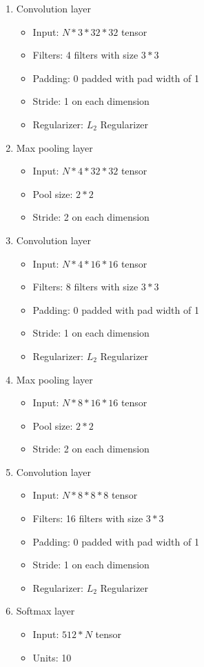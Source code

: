 \documentclass{article}
\begin{document}
\begin{enumerate}
    \item{Convolution layer}
        \begin{itemize}
            \item{Input: $N * 3 * 32 * 32$ tensor}
            \item{Filters: 4 filters with size $3*3$}
            \item{Padding: 0 padded with pad width of 1}
            \item{Stride: 1 on each dimension}
            \item{Regularizer: $L_2$ Regularizer}
        \end{itemize}
    \item{Max pooling layer}
        \begin{itemize}
            \item{Input: $N * 4 * 32 * 32$ tensor}
            \item{Pool size: $2*2$}
            \item{Stride: 2 on each dimension}
        \end{itemize}
    \item{Convolution layer}
        \begin{itemize}
            \item{Input: $N * 4 * 16 * 16$ tensor}
            \item{Filters: 8 filters with size $3*3$}
            \item{Padding: 0 padded with pad width of 1}
            \item{Stride: 1 on each dimension}
            \item{Regularizer: $L_2$ Regularizer}
        \end{itemize}
    \item{Max pooling layer}
        \begin{itemize}
            \item{Input: $N * 8 * 16 * 16$ tensor}
            \item{Pool size: $2*2$}
            \item{Stride: 2 on each dimension}
        \end{itemize}
    \item{Convolution layer}
        \begin{itemize}
            \item{Input: $N * 8 * 8 * 8$ tensor}
            \item{Filters: 16 filters with size $3*3$}
            \item{Padding: 0 padded with pad width of 1}
            \item{Stride: 1 on each dimension}
            \item{Regularizer: $L_2$ Regularizer}
        \end{itemize}
    \item{Softmax layer}
        \begin{itemize}
            \item{Input: $512 * N$ tensor}
            \item{Units: 10}
        \end{itemize}
\end{enumerate}
\end{document}
